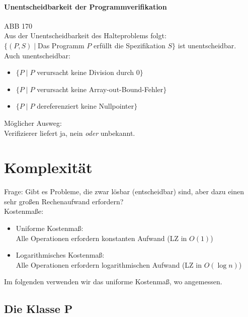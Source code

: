 \subsubsection{Unentscheidbarkeit der Programmverifikation}
ABB 170\\
Aus der Unentscheidbarkeit des Halteproblems folgt:\\
$\{ (P,S) \; | \; $Das Programm $P$ erfüllt die Spezifikation $S\}$ ist unentscheidbar.\\
Auch unentscheidbar:
\begin{itemize}
\item $\{P\;|\;P$ verursacht keine Division durch $0\}$
\item $\{P\;|\;P$ verursacht keine Array-out-Bound-Fehler$\}$
\item $\{P\;|\;P$ dereferenziert keine Nullpointer$\}$
\end{itemize}
Möglicher Ausweg:\\
Verifizierer liefert ja, nein \emph{oder} unbekannt.

\chapter{Komplexität}
Frage: Gibt es Probleme, die zwar lösbar (entscheidbar) sind, aber dazu einen sehr großen Rechenaufwand erfordern?\medskip\\
Kostenmaße:
\begin{itemize}
\item Uniforme Kostenmaß:\\
Alle Operationen erfordern konstanten Aufwand (LZ in $O(1)$)
\item Logarithmisches Kostenmaß:\\
Alle Operationen erfordern logarithmischen Aufwand (LZ in $O(\log n)$)
\end{itemize}
Im folgenden verwenden wir das uniforme Kostenmaß, wo angemessen.

\section{Die Klasse P}
